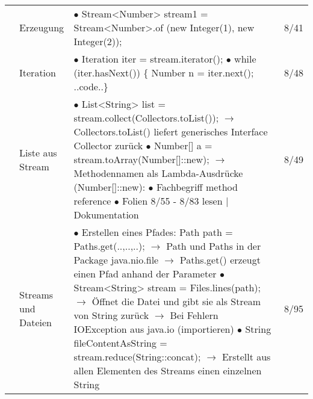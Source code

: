 \documentclass[11pt,a4paper]{article}
\begin{document}
\begin{center}
\begin{longtable}[h]{ | p{2.3cm} | p{2.3cm} | p{12.6cm} | p{1.2cm} | }
	& Erzeugung & \makecell[l]{$\bullet$ Stream<Number> stream1 = Stream<Number>.of \\
	\hspace{3cm} (new Integer(1), new Integer(2)); }  & 8/41 \\ \cline{2-4}
	
	& Iteration & \makecell[l]{$\bullet$ Iteration iter = stream.iterator(); \\
	$\bullet$ while (iter.hasNext()) \{ Number n = iter.next(); ..code..\} }  & 8/48 \\ \cline{2-4}
	
	& \makecell[l]{ Liste aus \\ Stream} & \makecell[l]{$\bullet$ List<String> list = stream.collect(Collectors.toList()); \\
	$\rightarrow$ Collectors.toList() liefert generisches Interface Collector zurück \\ 
	$\bullet$ Number[] a = stream.toArray(Number[]::new); \\
	$\rightarrow$ Methodennamen als Lambda-Ausdrücke (Number[]::new): \\
	\hspace{0.4cm} $\bullet$ Fachbegriff method reference \\
	\hspace{0.4cm} $\bullet$ Folien 8/55 - 8/83 lesen | Dokumentation  }  & 8/49 \\ \cline{2-4}
	
	& \makecell[l]{Streams und \\ Dateien} & 
	\makecell[l]{$\bullet$ Erstellen eines Pfades: Path path = Paths.get(..,..,..); \\
	\hspace{0.4cm} $\rightarrow$ Path und Paths in der Package java.nio.file \\
	\hspace{0.4cm} $\rightarrow$ Paths.get() erzeugt einen Pfad anhand der Parameter \\
	$\bullet$ Stream<String> stream = Files.lines(path); \\
	\hspace{0.4cm} $\rightarrow$ Öffnet die Datei und gibt sie als Stream von String zurück \\
	\hspace{0.4cm} $\rightarrow$ Bei Fehlern IOException aus java.io (importieren) \\
	$\bullet$ String fileContentAsString = stream.reduce(String::concat); \\
	\hspace{0.4cm} $\rightarrow$ Erstellt aus allen Elementen des Streams einen einzelnen String}  & 8/95 \\ \cline{2-4}
	

\end{longtable}
\end{center}
\end{document}
